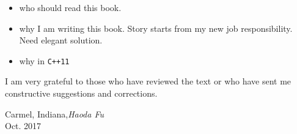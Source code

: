 %
%

\preface

\begin{itemize}
	\item  who should read this book.
	\item why I am writing this book. Story starts from my new job responsibility. Need elegant solution.
	\item why in \texttt{C++11}
\end{itemize}

I am very grateful to those who have reviewed the text or who have sent me constructive suggestions and corrections. 

\vspace{\baselineskip}
\begin{flushright}\noindent
Carmel, Indiana,\hfill {\it Haoda Fu}\\
Oct. 2017 \hfill\\
\end{flushright}


